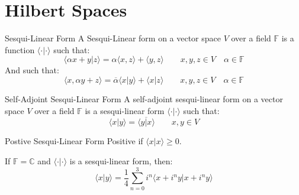 \documentclass[crop=false,class=book,oneside]{standalone}                      %
\begin{document}
    \section{Hilbert Spaces}
        \begin{ldefinition}{Sesqui-Linear Form}
            A Sesqui-Linear form on a vector space $V$ over a
            field $\mathbb{F}$ is a function
            $\langle{\cdot|\cdot}\rangle$ such that:
            \begin{equation}
                \langle{\alpha{x}+y|z}\rangle
                =\alpha\langle{x,z}\rangle+\langle{y,z}\rangle
                \quad\quad
                x,y,z\in{V}
                \quad
                \alpha\in\mathbb{F}
            \end{equation}
            And such that:
            \begin{equation}
                \langle{x,\alpha{y}+z}\rangle
                =\overline{\alpha}\langle{x|y}\rangle
                +\langle{x|z}\rangle
               \quad\quad
                x,y,z\in{V}
                \quad
                \alpha\in\mathbb{F}
            \end{equation}
        \end{ldefinition}
        \begin{ldefinition}{Self-Adjoint Sesqui-Linear Form}
            A self-adjoint sesqui-linear form on a vector space
            $V$ over a field $\mathbb{F}$ is a sesqui-linear
            form $\langle{\cdot|\cdot}\rangle$ such that:
            \begin{equation}
                \langle{x|y}\rangle=\overline{\langle{y|x}\rangle}
                \quad\quad
                x,y\in{V}
            \end{equation}
        \end{ldefinition}
        \begin{ldefinition}{Postive Sesqui-Linear Form}
            Positive if $\langle{x|x}\rangle\geq{0}$.
        \end{ldefinition}
        \begin{theorem}
            If $\mathbb{F}=\mathbb{C}$ and
            $\langle{\cdot|\cdot}\rangle$ is a sesqui-linear
            form, then:
            \begin{equation}
                \langle{x|y}\rangle
                =\frac{1}{4}\sum_{n=0}^{3}
                    i^{n}\langle{x+i^{n}y|x+i^{n}y}\rangle
            \end{equation}
        \end{theorem}
\end{document}
